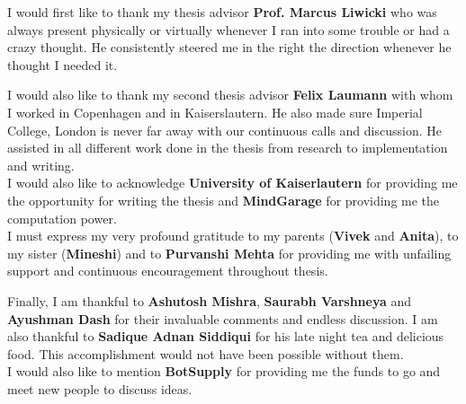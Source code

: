 
\begin{acknowledgements}      

I would first like to thank my thesis advisor \textbf{Prof. Marcus Liwicki} who was always present physically or virtually whenever I ran into some trouble or had a crazy thought. He consistently steered me in the right the direction whenever he thought I needed it.

I would also like to thank my second thesis advisor \textbf{Felix Laumann} with whom I worked in Copenhagen and in Kaiserslautern. He also made sure Imperial College, London is never far away with our continuous calls and discussion. He assisted in all different work done in the thesis from research to implementation and writing.\\

I would also like to acknowledge \textbf{University of Kaiserlautern} for providing me the opportunity for writing the thesis and \textbf{MindGarage} for providing me the computation power.\\

I must express my very profound gratitude to my parents (\textbf{Vivek} and \textbf{Anita}), to my sister (\textbf{Mineshi}) and to \textbf{Purvanshi Mehta} for providing me with unfailing support and continuous encouragement throughout thesis. 

Finally, I am thankful to \textbf{Ashutosh Mishra}, \textbf{Saurabh Varshneya} and \textbf{Ayushman Dash} for their invaluable comments and endless discussion. I am also thankful to \textbf{Sadique Adnan Siddiqui} for his late night tea and delicious food. This accomplishment would not have been possible without them. \\

I would also like to mention \textbf{BotSupply} for providing me the funds to go and meet new people to discuss ideas. \\ \\



\end{acknowledgements}
